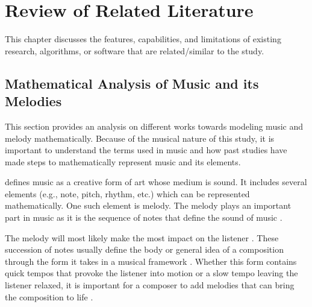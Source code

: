 %
%
%                 

\chapter{Review of Related Literature}
\label{sec:relatedlit}
\begin{comment}
then for team MusicG my suggested columns would be 
2.1 Authors | Focus (if melody, chord, progression, sequence) | Model (what math formula or name did they use no need to put formula sa table) 
2.2 Authors | Name of Tool | Platform | Input Type | Algorithm (what they used to generate sequences)
2.3 Authors | Name of Tool | How many testers | Comments  and other  reported findings
Testing Someting
\end{comment}

This chapter discusses the features, capabilities, and limitations of existing research, algorithms, or software that are related/similar to the study.

\section{Mathematical Analysis of Music and its Melodies}
This section provides an analysis on different works towards modeling music and melody mathematically. Because of the musical nature of this study, it is important to understand the terms used in music and how past studies have made steps to mathematically represent music and its elements.

\citet{loy2011musimathics} defines music as a creative form of art whose medium is sound. It includes several elements (e.g., note, pitch, rhythm, etc.) which can be represented mathematically. One such element is melody. The melody plays an important part in music \citep{unehara2001composition,unehara2005music} as it is the sequence of notes that define the sound of music \citep{ryynanen2008automatic}. 

The melody will most likely make the most impact on the listener \citep{jarret2008music}. These succession of notes usually define the body or general idea of a composition through the form it takes in a musical framework \citep{jarret2008music}. Whether this form contains quick tempos that provoke the listener into motion or a slow tempo leaving the listener relaxed, it is important for a composer to add melodies that can bring the composition to life \citep{jarret2008music}. 


